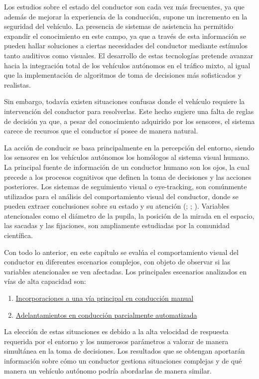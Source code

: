 Los estudios sobre el estado del conductor son cada vez más frecuentes, ya que además de mejorar la experiencia de la conducción, supone un incremento en la seguridad del vehículo. La presencia de sistemas de asistencia ha permitido expandir el conocimiento en este campo, ya que a través de esta información se pueden hallar soluciones a ciertas necesidades del conductor mediante estímulos tanto auditivos como visuales. El desarrollo de estas tecnologías pretende avanzar hacia la integración total de los vehículos autónomos en el tráfico mixto, al igual que la implementación de algoritmos de toma de decisiones más sofisticados y realistas. 

Sin embargo, todavía existen situaciones confusas donde el vehículo requiere la intervención del conductor para resolverlas. Este hecho sugiere una falta de reglas de decisión ya que, a pesar del conocimiento adquirido por los sensores, el sistema carece de recursos que el conductor sí posee de manera natural.

La acción de conducir se basa principalmente en la percepción del entorno, siendo los sensores en los vehículos autónomos los homólogos al sistema visual humano. La principal fuente de información de un conductor humano son los ojos, la cual precede a los procesos cognitivos que definen la toma de decisiones y las acciones posteriores. Los sistemas de seguimiento visual o eye-tracking, son comúnmente utilizados para el análisis del comportamiento visual del conductor, donde se pueden extraer conclusiones sobre su estado y su atención (\cite{werneke}; \cite{lemonnier}; \cite{vetturi}). Variables atencionales como el diámetro de la pupila, la posición de la mirada en el espacio, las sacadas y las fijaciones, son ampliamente estudiadas por la comunidad científica. 

Con todo lo anterior, en este capítulo se evalúa el comportamiento visual del conductor en diferentes escenarios complejos, con objeto de observar si las variables atencionales se ven afectadas. Los principales escenarios analizados en vías de alta capacidad son:

\begin{enumerate}
    \item \hyperref[31]{Incorporaciones a una vía principal en conducción manual} 
    \item \hyperref[32]{Adelantamientos en conducción parcialmente automatizada} 
\end{enumerate}

La elección de estas situaciones es debido a la alta velocidad de respuesta requerida por el entorno y los numerosos parámetros a valorar de manera simultánea en la toma de decisiones. Los resultados que se obtengan aportarán información sobre cómo un conductor gestiona situaciones complejas y de qué manera un vehículo autónomo podría abordarlas de manera similar.

